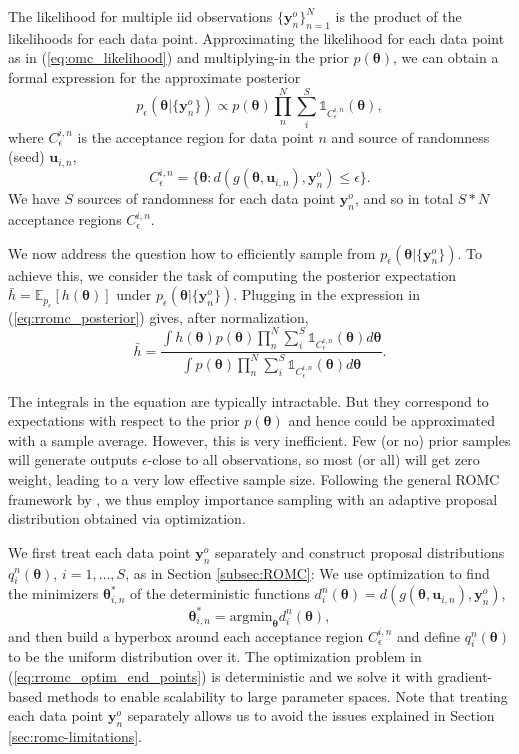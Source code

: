 \documentclass[twoside]{article}
\newcommand{\thb}{\boldsymbol{\theta}}
\newcommand{\ub}{\mathbf{u}}
\newcommand{\data}{\mathbf{y}^o}
\newcommand{\E}{\mathbb{E}}
\begin{document}
The likelihood for multiple iid observations $\{\data_n\}_{n=1}^N$ is the product of the likelihoods for each data point. Approximating the likelihood for each data point as in (\ref{eq:omc_likelihood}) and multiplying-in the prior $p(\thb)$, we can obtain a formal expression for the approximate posterior
\begin{equation}
  \label{eq:rromc_posterior}
  p_{\epsilon}(\thb | \{\data_n\}) \propto p(\thb) \prod_{n}^{N} \sum_{i}^S \mathbb{1}_{C_{\epsilon}^{i,n}}(\thb),
\end{equation}
where $C_{\epsilon}^{i,n}$ is the acceptance region for data point $n$ and source of randomness (seed) $\ub_{i,n}$,
\begin{equation}
C_{\epsilon}^{i,n} = \{\thb : d(g(\thb, \ub_{i,n}), \data_n) \leq \epsilon \}.
\end{equation}
We have $S$ sources of randomness for each data point $\data_n$, and so in total $S*N$ acceptance regions $C_{\epsilon}^{i,n}$.

We now address the question how to efficiently sample from $p_{\epsilon}(\thb | \{\data_n\})$. To achieve this, we consider the task of computing the posterior expectation $\bar{h} = \E_{p_{\epsilon}}[h(\thb)]$ under $p_{\epsilon}(\thb | \{\data_n\})$. Plugging in the expression in (\ref{eq:rromc_posterior}) gives, after normalization,
\begin{equation}
  \label{eq:rromc_expectation}
  \bar{h} = \frac{ \int h(\thb) p(\thb) \prod_n^N \sum_i^S \mathbb{1}_{C_{\epsilon}^{i,n}}(\thb) d\thb}{\int p(\thb) \prod_n^N \sum_i^S \mathbb{1}_{C_{\epsilon}^{i,n}}(\thb) d\thb}.
\end{equation}

The integrals in the equation are typically intractable. But they correspond to expectations with respect to the prior $p(\thb)$ and hence could be approximated with a sample average. However, this is very inefficient. Few (or no) prior samples will generate outputs $\epsilon$-close to all observations, so most (or all) will get zero weight, leading to a very low effective sample size. Following the general ROMC framework by \citet{ikonomov2020robust}, we thus employ importance sampling with an adaptive proposal distribution obtained via optimization. 

We first treat each data point $\data_n$ separately and construct proposal distributions $q_i^n(\thb)$, $i=1, \ldots, S$, as in Section \ref{subsec:ROMC}: We use optimization to find the minimizers $\thb_{i,n}^*$ of the deterministic functions $d_i^n(\thb) = d(g(\thb, \ub_{i,n}), \data_n)$,       
\begin{equation}
 \thb_{i,n}^* = \text{argmin}_{\thb} d_i^n(\thb),
 \label{eq:rromc_optim_end_points}
\end{equation}
and then build a hyperbox around each acceptance region $C_{\epsilon}^{i,n}$ and define $q_i^n(\thb)$ to be the uniform distribution over it. The optimization problem in (\ref{eq:rromc_optim_end_points}) is deterministic and we solve it with gradient-based methods to enable scalability to large parameter spaces. Note that treating each data point $\data_n$ separately allows us to avoid the issues explained in Section \ref{sec:romc-limitations}.
\end{document}
